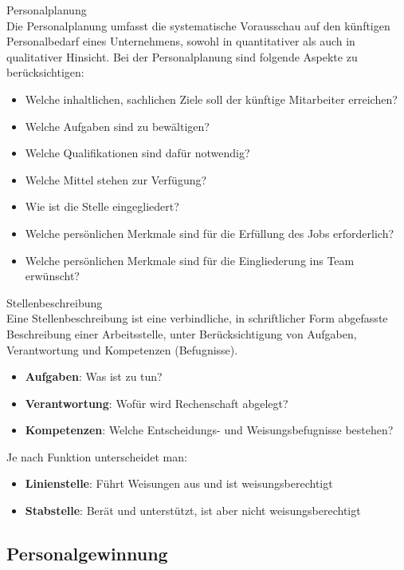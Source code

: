 \begin{definition}{Personalplanung}\\
Die Personalplanung umfasst die systematische Vorausschau auf den künftigen Personalbedarf eines Unternehmens, sowohl in quantitativer als auch in qualitativer Hinsicht. Bei der Personalplanung sind folgende Aspekte zu berücksichtigen:
\begin{itemize}
    \item Welche inhaltlichen, sachlichen Ziele soll der künftige Mitarbeiter erreichen?
    \item Welche Aufgaben sind zu bewältigen?
    \item Welche Qualifikationen sind dafür notwendig?
    \item Welche Mittel stehen zur Verfügung?
    \item Wie ist die Stelle eingegliedert?
    \item Welche persönlichen Merkmale sind für die Erfüllung des Jobs erforderlich?
    \item Welche persönlichen Merkmale sind für die Eingliederung ins Team erwünscht?
\end{itemize}
\end{definition}

\begin{definition}{Stellenbeschreibung}\\
Eine Stellenbeschreibung ist eine verbindliche, in schriftlicher Form abgefasste Beschreibung einer Arbeitsstelle, unter Berücksichtigung von Aufgaben, Verantwortung und Kompetenzen (Befugnisse).
\begin{itemize}
    \item \textbf{Aufgaben}: Was ist zu tun?
    \item \textbf{Verantwortung}: Wofür wird Rechenschaft abgelegt?
    \item \textbf{Kompetenzen}: Welche Entscheidungs- und Weisungsbefugnisse bestehen?
\end{itemize}

Je nach Funktion unterscheidet man:
\begin{itemize}
    \item \textbf{Linienstelle}: Führt Weisungen aus und ist weisungsberechtigt
    \item \textbf{Stabstelle}: Berät und unterstützt, ist aber nicht weisungsberechtigt
\end{itemize}
\end{definition}

\subsection{Personalgewinnung}

